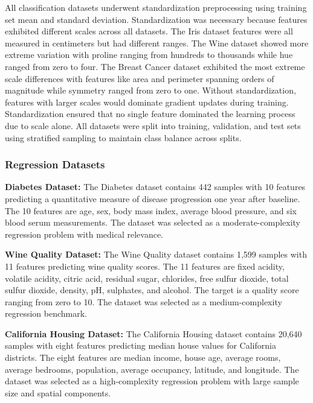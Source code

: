 \documentclass[conference]{IEEEtran}
\begin{document}
All classification datasets underwent standardization preprocessing using training set mean and standard deviation. Standardization was necessary because features exhibited different scales across all datasets. The Iris dataset features were all measured in centimeters but had different ranges. The Wine dataset showed more extreme variation with proline ranging from hundreds to thousands while hue ranged from zero to four. The Breast Cancer dataset exhibited the most extreme scale differences with features like area and perimeter spanning orders of magnitude while symmetry ranged from zero to one. Without standardization, features with larger scales would dominate gradient updates during training. Standardization ensured that no single feature dominated the learning process due to scale alone. All datasets were split into training, validation, and test sets using stratified sampling to maintain class balance across splits.

\subsubsection{Regression Datasets}

\textbf{Diabetes Dataset:}
The Diabetes dataset contains 442 samples with 10 features predicting a quantitative measure of disease progression one year after baseline. The 10 features are age, sex, body mass index, average blood pressure, and six blood serum measurements. The dataset was selected as a moderate-complexity regression problem with medical relevance.

\textbf{Wine Quality Dataset:}
The Wine Quality dataset contains 1,599 samples with 11 features predicting wine quality scores. The 11 features are fixed acidity, volatile acidity, citric acid, residual sugar, chlorides, free sulfur dioxide, total sulfur dioxide, density, pH, sulphates, and alcohol. The target is a quality score ranging from zero to 10. The dataset was selected as a medium-complexity regression benchmark.

\textbf{California Housing Dataset:}
The California Housing dataset contains 20,640 samples with eight features predicting median house values for California districts. The eight features are median income, house age, average rooms, average bedrooms, population, average occupancy, latitude, and longitude. The dataset was selected as a high-complexity regression problem with large sample size and spatial components.
\end{document}
